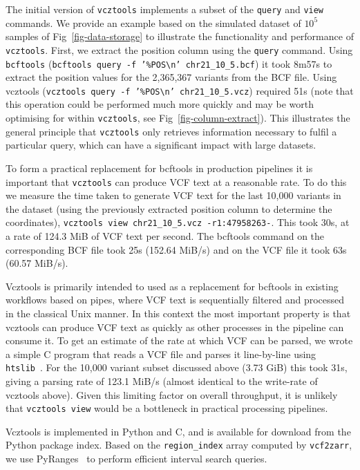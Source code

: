 \documentclass[a4paper,num-refs]{oup-contemporary}
\begin{document}
The initial version of \texttt{vcztools} implements a subset of the \texttt{query}
and \texttt{view} commands. We provide an example based on the simulated
dataset of $10^5$ samples of Fig~\ref{fig-data-storage} to illustrate
the functionality and
performance of \texttt{vcztools}. First, we extract the position column
using the \texttt{query} command. Using \texttt{bcftools}
(\texttt{bcftools query -f '\%POS\textbackslash n' chr21\_10\_5.bcf})
it took 8m57s to extract the position values for the 2,365,367
variants from the BCF file.
Using vcztools
(\texttt{vcztools query -f '\%POS\textbackslash n' chr21\_10\_5.vcz})
required 51s (note that this operation could be performed much
more quickly and may be worth optimising for within \texttt{vcztools}, see
Fig~\ref{fig-column-extract}). This illustrates the general principle
that \texttt{vcztools} only retrieves information necessary to fulfil a particular
query, which can have a significant impact with large datasets.

To form a practical replacement for bcftools in production pipelines
it is important that \texttt{vcztools} can produce VCF text at a reasonable
rate. To do this we measure the time taken to generate VCF text for the
last 10,000 variants in the dataset (using the previously extracted
position column to determine the coordinates), 
\texttt{vcztools view
chr21\_10\_5.vcz -r1:47958263-}. This took 30s, at a rate of 124.3 MiB
of VCF text per second. The bcftools command on the corresponding
BCF file took 25s (152.64 MiB/s) and on the VCF file it took 63s (60.57 MiB/s).

Vcztools is primarily intended to used as a replacement for bcftools
in existing workflows based on pipes, where VCF text is sequentially
filtered and processed in the classical
Unix manner. In this context the most important property is that vcztools
can produce VCF text as quickly as other processes in the pipeline can consume
it. To get an estimate of the rate at which VCF can be parsed, we wrote a simple
C program that reads a VCF file and parses it line-by-line using 
\texttt{htslib}~\citep{bonfield2021htslib}. 
For the 10,000 variant subset discussed
above (3.73 GiB) this took 31s, giving a parsing rate of 123.1 MiB/s
(almost identical to the write-rate of vcztools above). Given this limiting
factor on overall throughput,
it is unlikely that \texttt{vcztools view} would be a bottleneck
in practical processing pipelines.

Vcztools is implemented in Python and C, and is available for download 
from the Python package index. 
Based on the \texttt{region\_index} array computed by \texttt{vcf2zarr},
we use PyRanges~\citep{stovner2020pyranges} to perform efficient interval
search queries. 
\end{document}
